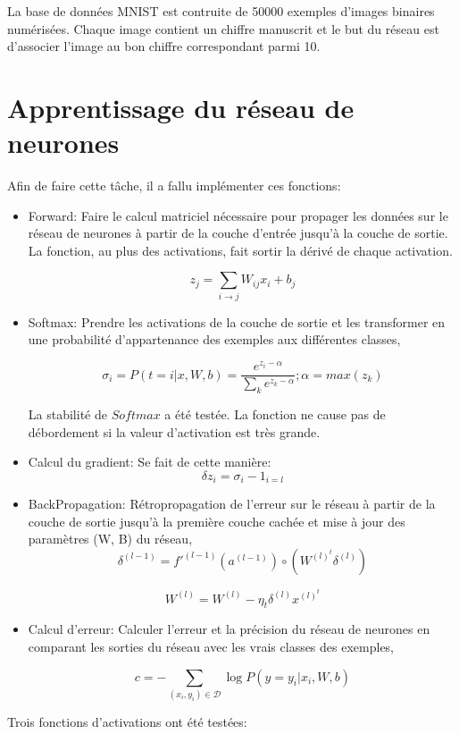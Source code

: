 \documentclass[a4paper,english,12pt]{article}
\begin{document}
La base de données MNIST est contruite de 50000 exemples d'images binaires numérisées. Chaque image contient un chiffre manuscrit et le but du réseau est d'associer l'image au bon chiffre correspondant parmi 10. 

\section{Apprentissage du réseau de neurones}
Afin de faire cette tâche, il a fallu implémenter ces fonctions:
\begin{itemize}
	\item Forward: Faire le calcul matriciel nécessaire pour propager les données sur le réseau de neurones à partir de la couche d'entrée jusqu'à la couche de sortie. La fonction, au plus des activations, fait sortir la dérivé de chaque activation.
	
	$$z_j = \sum_{i \rightarrow j} W_{ij} x_i + b_j$$
	
	\item Softmax: Prendre les activations de la couche de sortie et les transformer en une probabilité d'appartenance des exemples aux différentes classes,
	
	$$ \sigma_i = P(t=i|x,W,b) = \frac{e^{z_i-\alpha}}{\sum_k e^{z_k-\alpha}} ; \alpha=max(z_k)$$
	
	La stabilité de $Softmax$ a été testée. La fonction ne cause pas de débordement si la valeur d'activation est très grande.
	
	\item Calcul du gradient: Se fait de cette manière:	
		$$\delta z_i = \sigma_i - 1_{i=l}$$	
		
	\item BackPropagation: Rétropropagation de l'erreur sur le réseau à partir de la couche de sortie jusqu'à la première couche cachée et mise à jour des paramètres (W, B) du réseau,
		$$\delta^{(l-1)}=f'^{(l-1)}(a^{(l-1)}) \circ (W^{(l)^t}\delta^{(l)})$$
		
		$$W^{(l)}=W^{(l)}-\eta_t \delta^{(l)} x^{(l)^t}$$		
	\item Calcul d'erreur: Calculer l'erreur et la précision du réseau de neurones en comparant les sorties du réseau avec les vrais classes des exemples,
	
	$$c = - \sum_{(x_{i}, y_{i}) \in \mathcal{D}} \log P(y=y_{i}|x_{i},W,b)$$
	
\end{itemize}

Trois fonctions d'activations ont été testées:
\end{document}
